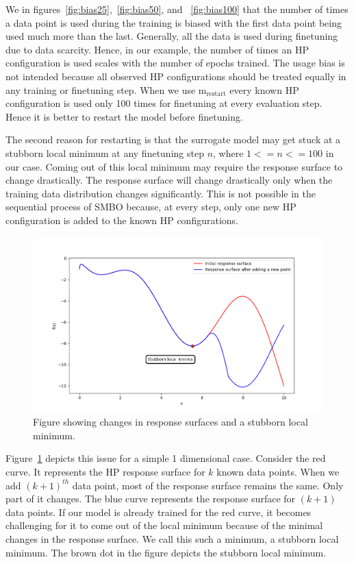\documentclass[12pt, twoside, ngerman]{report}
\begin{document}
We in figures~\ref{fig:bias25},~\ref{fig:bias50},  and ~\ref{fig:bias100} that the number of times a data point is used during the training is biased with the first data point being used much more than the last.
Generally, all the data is used during finetuning due to data scarcity.
Hence,  in our example, the number of times an HP configuration is used scales with the number of epochs trained.
The usage bias is not intended because all observed HP configurations should be treated equally in any training or finetuning step.
When we use $\textrm{m}_{\textrm{restart}}$ every known HP configuration is used only 100 times for finetuning at every evaluation step.
Hence it is better to restart the model before finetuning.

The second reason for restarting is that the surrogate model may get stuck at a stubborn local minimum at any finetuning step $n$, where $1 <= n <= 100$ in our case.
Coming out of this local minimum may require the response surface to change drastically.
The response surface will change drastically only when the training data distribution changes significantly.
This is not possible in the sequential process of SMBO because, at every step, only one new HP configuration is added to the known HP configurations.

\begin{figure}[htb]
  \centering
    \includegraphics[scale=0.45]{images/localMinima}
    \caption{Figure showing changes in response surfaces and a stubborn local minimum.}
    \label{fig:localMinima}
\end{figure}

Figure~\ref{fig:localMinima} depicts this issue for a simple 1 dimensional case.
Consider the red curve.
It represents the HP response surface for $k$ known data points.
When we add $(k+1)^{th}$ data point,  most of the response surface remains the same.
Only part of it changes.
The blue curve represents the response surface for $(k+1)$ data points.
If our model is already trained for the red curve,  it becomes challenging for it to come out of the local minimum because of the minimal changes in the response surface.
We call this such a minimum, a stubborn local minimum.
The brown dot in the figure depicts the stubborn local minimum.
\end{document}
